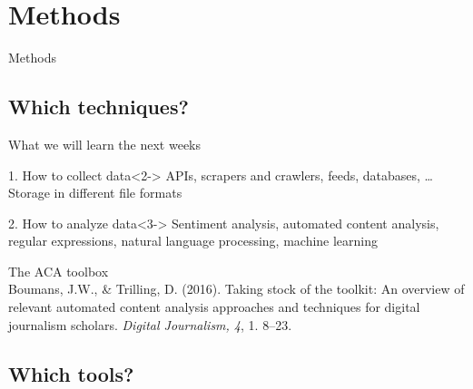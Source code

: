 \documentclass{beamer}
\begin{document}
\section{Methods}
\begin{frame}
Methods
\end{frame}

\subsection{Which techniques?}

\begin{frame}{What we will learn the next weeks}
\begin{block}{1. How to collect data}<2->
APIs, scrapers and crawlers, feeds, databases, \ldots \\
Storage in different file formats
\end{block}
\begin{block}{2. How to analyze data}<3->
Sentiment analysis, automated content analysis, regular expressions, natural language processing, machine learning
\end{block}
\end{frame}


\begin{frame}{The ACA toolbox}
	\\
	\tiny
	Boumans, J.W., \& Trilling, D. (2016). Taking stock of the toolkit: An overview of relevant automated content analysis approaches and techniques for digital journalism scholars. \emph{Digital Journalism, 4}, 1. 8--23.
\end{frame}


\subsection{Which tools?}
\end{document}
